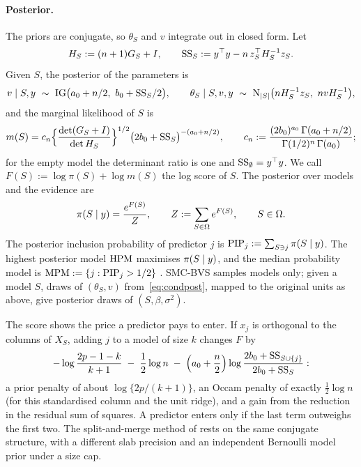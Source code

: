 \paragraph{Posterior.} The priors are conjugate, so $\theta_S$ and $v$ integrate out in closed form. Let
\begin{equation}\label{eq:HS}
  H_S:=(n+1)G_S+I,\qquad \mathrm{SS}_S:=y^\top y-n\,z_S^\top H_S^{-1}z_S .
\end{equation}
Given $S$, the posterior of the parameters is
\begin{equation}\label{eq:condpost}
  v\mid S,y\ \sim\ \IG\big(a_0+n/2,\ b_0+\SSq_S/2\big),\qquad
  \theta_S\mid S,v,y\ \sim\ \Normal_{\abs S}\big(nH_S^{-1}z_S,\ nvH_S^{-1}\big),
\end{equation}
and the marginal likelihood of $S$ is
\begin{equation}\label{eq:marglik}
  m(S)=c_n\Big\{\frac{\det(G_S+I)}{\det H_S}\Big\}^{1/2}\big(2b_0+\mathrm{SS}_S\big)^{-(a_0+n/2)},\qquad
  c_n:=\frac{(2b_0)^{a_0}\,\Gamma(a_0+n/2)}{\Gamma(1/2)^n\,\Gamma(a_0)};
\end{equation}
for the empty model the determinant ratio is one and $\mathrm{SS}_\emptyset=y^\top y$. We call $F(S):=\log\pi(S)+\log m(S)$
the log score of $S$. The posterior over models and the evidence are
\begin{equation}\label{eq:posterior}
  \pi(S\mid y)=\frac{e^{F(S)}}{Z},\qquad Z:=\sum_{S\in\Omega}e^{F(S)},\qquad S\in\Omega .
\end{equation}
The posterior inclusion probability of predictor $j$ is $\mathrm{PIP}_j:=\sum_{S\ni j}\pi(S\mid y)$. The highest posterior model
$\mathrm{HPM}$ maximises $\pi(S\mid y)$, and the median probability model is $\mathrm{MPM}:=\{j:\mathrm{PIP}_j>1/2\}$ \citep{BarbieriBerger2004}.
SMC-BVS samples models only; given a model $S$, draws of $(\theta_S,v)$ from~\eqref{eq:condpost}, mapped to the
original units as above, give posterior draws of $(S,\beta,\sigma^2)$.

The score shows the price a predictor pays to enter. If $x_j$ is orthogonal to the columns of $X_S$, adding $j$ to
a model of size $k$ changes $F$ by
\[
  -\log\frac{2p-1-k}{k+1}\;-\;\frac12\log n\;-\;\Big(a_0+\frac n2\Big)\log\frac{2b_0+\mathrm{SS}_{S\cup\{j\}}}{2b_0+\mathrm{SS}_S}:
\]
a prior penalty of about $\log\{2p/(k+1)\}$, an Occam penalty of exactly $\tfrac12\log n$ (for this standardised
column and the unit ridge), and a gain from the reduction in the residual sum of squares. A predictor enters only if
the last term outweighs the first two. The split-and-merge method of \citet{SongLiang2015} rests on the same conjugate
structure, with a different slab precision and an independent Bernoulli model prior under a size cap.

